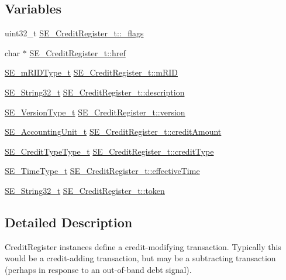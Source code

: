 \subsection*{Variables}
\begin{DoxyCompactItemize}
\item 
uint32\+\_\+t \hyperlink{group__CreditRegister_gadbc5a3366401cd1972b2e99c05b685f0}{S\+E\+\_\+\+Credit\+Register\+\_\+t\+::\+\_\+flags}
\item 
char $\ast$ \hyperlink{group__CreditRegister_ga6dc29bbd10dc51848e6fbedbfbdbc428}{S\+E\+\_\+\+Credit\+Register\+\_\+t\+::href}
\item 
\hyperlink{group__mRIDType_gac74622112f3a388a2851b2289963ba5e}{S\+E\+\_\+m\+R\+I\+D\+Type\+\_\+t} \hyperlink{group__CreditRegister_ga08dc81d2c42276324c84c732071a907a}{S\+E\+\_\+\+Credit\+Register\+\_\+t\+::m\+R\+ID}
\item 
\hyperlink{group__String32_gac9f59b06b168b4d2e0d45ed41699af42}{S\+E\+\_\+\+String32\+\_\+t} \hyperlink{group__CreditRegister_gaa27bbe878f77be7bdaa8a8a74d845f0c}{S\+E\+\_\+\+Credit\+Register\+\_\+t\+::description}
\item 
\hyperlink{group__VersionType_ga4b8d27838226948397ed99f67d46e2ae}{S\+E\+\_\+\+Version\+Type\+\_\+t} \hyperlink{group__CreditRegister_gae291a84e122c89e218a4a85dc5be4cb7}{S\+E\+\_\+\+Credit\+Register\+\_\+t\+::version}
\item 
\hyperlink{structSE__AccountingUnit__t}{S\+E\+\_\+\+Accounting\+Unit\+\_\+t} \hyperlink{group__CreditRegister_ga1ddd68658ee4d433120cf122868ada78}{S\+E\+\_\+\+Credit\+Register\+\_\+t\+::credit\+Amount}
\item 
\hyperlink{group__CreditTypeType_ga5a63742e5c65087df17ed6ad8f420b5e}{S\+E\+\_\+\+Credit\+Type\+Type\+\_\+t} \hyperlink{group__CreditRegister_ga64f4538c159f8e56b25fad6e98265b86}{S\+E\+\_\+\+Credit\+Register\+\_\+t\+::credit\+Type}
\item 
\hyperlink{group__TimeType_ga6fba87a5b57829b4ff3f0e7638156682}{S\+E\+\_\+\+Time\+Type\+\_\+t} \hyperlink{group__CreditRegister_gabed95bad275808f5aefbf623bc20aaec}{S\+E\+\_\+\+Credit\+Register\+\_\+t\+::effective\+Time}
\item 
\hyperlink{group__String32_gac9f59b06b168b4d2e0d45ed41699af42}{S\+E\+\_\+\+String32\+\_\+t} \hyperlink{group__CreditRegister_ga360e14671fe75ee6b62e1034f2045ee9}{S\+E\+\_\+\+Credit\+Register\+\_\+t\+::token}
\end{DoxyCompactItemize}


\subsection{Detailed Description}
Credit\+Register instances define a credit-\/modifying transaction. Typically this would be a credit-\/adding transaction, but may be a subtracting transaction (perhaps in response to an out-\/of-\/band debt signal). 

